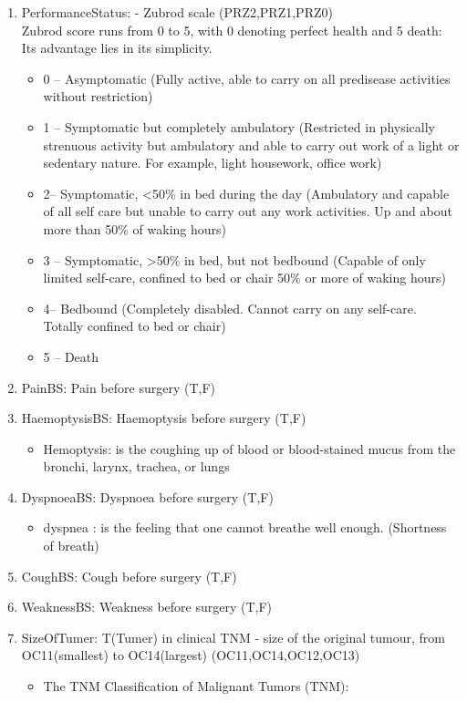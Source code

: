 \documentclass[a4paper, 11pt, oneside]{article} %
\begin{document}
\begin{enumerate}
\item PerformanceStatus: - Zubrod scale (PRZ2,PRZ1,PRZ0)\\
Zubrod score runs from 0 to 5, with 0 denoting perfect health and 5 death: Its advantage lies in its simplicity.
\begin{itemize}
\item 0 – Asymptomatic (Fully active, able to carry on all predisease activities without restriction)
\item 1 – Symptomatic but completely ambulatory (Restricted in physically strenuous activity but ambulatory and able to carry out work of a light or sedentary nature. For example, light housework, office work)
\item  2– Symptomatic, <50\% in bed during the day (Ambulatory and capable of all self care but unable to carry out any work activities. Up and about more than 50\% of waking hours)
\item 3 – Symptomatic, >50\% in bed, but not bedbound (Capable of only limited self-care, confined to bed or chair 50\% or more of waking hours)
\item 4– Bedbound (Completely disabled. Cannot carry on any self-care. Totally confined to bed or chair)
\item 5 – Death
\end{itemize}
\item  PainBS: Pain before surgery (T,F)
\item HaemoptysisBS: Haemoptysis before surgery (T,F)
\begin{itemize}
\item {Hemoptysis:}
is the coughing up of blood or blood-stained mucus from the bronchi, larynx, trachea, or lungs
\end{itemize}
\item  DyspnoeaBS: Dyspnoea before surgery (T,F)
\begin{itemize}
\item{dyspnea :}
is the feeling that one cannot breathe well enough. (Shortness of breath)
\end{itemize}
\item  CoughBS: Cough before surgery (T,F)
\item WeaknessBS: Weakness before surgery (T,F)
\item SizeOfTumer: T(Tumer) in clinical TNM - size of the original tumour, from OC11(smallest) to OC14(largest)  (OC11,OC14,OC12,OC13)
\begin{itemize}
\item {The TNM Classification of Malignant Tumors (TNM):}

\end{itemize}
\end{enumerate}
\end{document}
